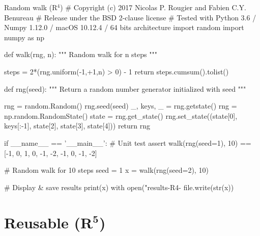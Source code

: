 \documentclass[a4paper,11pt]{article}
\begin{document}
\begin{code}{Random walk (R$^4$)}
# Copyright (c) 2017 Nicolas P. Rougier and Fabien C.Y. Benureau
# Release under the BSD 2-clause license
# Tested with Python 3.6 / Numpy 1.12.0 / macOS 10.12.4 / 64 bits architecture
import random
import numpy as np

def walk(rng, n):
    """ Random walk for n steps """

    steps = 2*(rng.uniform(-1,+1,n) > 0) - 1
    return steps.cumsum().tolist()

def rng(seed):
    """ Return a random number generator initialized with seed """ 
    
    rng = random.Random()
    rng.seed(seed)
    _, keys, _ = rng.getstate()
    rng = np.random.RandomState()
    state = rng.get_state()
    rng.set_state((state[0], keys[:-1], state[2], state[3], state[4]))
    return rng

if __name__ == '__main__':
    # Unit test
    assert walk(rng(seed=1), 10) == [-1, 0, 1, 0, -1, -2, -1, 0, -1, -2]

    # Random walk for 10 steps
    seed = 1
    x = walk(rng(seed=2), 10)

    # Display & save results
    print(x)
    with open("results-R4-%
        file.write(str(x))
\end{code}

\clearpage
\section*{Reusable (R$^{\mathbf 5}$)}
\end{document}
